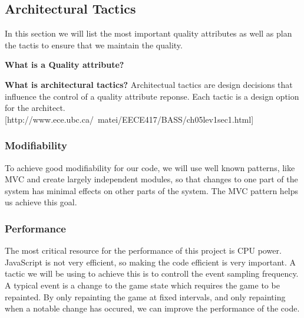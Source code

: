 \subsection{Architectural Tactics}
In this section we will list the most important quality attributes as 
well as plan the tactis to ensure that we maintain the quality.

{\bf What is a Quality attribute? }

{\bf What is architectural tactics? }
Architectual tactics are design decisions that influence the control of a quality attribute reponse. 
Each tactic is a design option for the architect. [http://www.ece.ubc.ca/~matei/EECE417/BASS/ch05lev1sec1.html]

\subsubsection{Modifiability}
To achieve good modifiability for our code, we will use well known patterns, like MVC and create largely 
independent modules, so that changes to one part of the system has minimal effects on other parts of the 
system. The MVC pattern helps us achieve this goal. 

\subsubsection{Performance}
The most critical resource for the performance of this project is CPU power. JavaScript is not very efficient, 
so making the code efficient is very important. A tactic we will be using to achieve this is to controll the 
event sampling frequency. A typical event is a change to the game state which requires the game to be repainted. 
By only repainting the game at fixed intervals, and only repainting when a notable change has occured, we can 
improve the performance of the code.